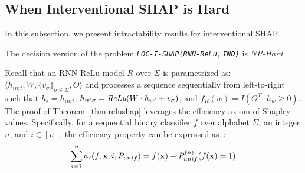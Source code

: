 \subsection{When Interventional SHAP is Hard}
\label{subsec:rnnreluhard}
In this subsection, we present intractability results for interventional SHAP.

\begin{theorem} \label{thm:relushap}
    The decision version of the problem \emph{\texttt{LOC-I-SHAP}}\emph{\texttt{(RNN-ReLu}, \texttt{IND)}} is \emph{NP-Hard}.
\end{theorem}

Recall that an RNN-ReLu model $R$ over $\Sigma$ is parametrized as: $\langle h_{init}, W, \{v_{\sigma}\}_{\sigma \in \Sigma}, O\rangle$ and processes a sequence sequentially from left-to-right such that $h_{\epsilon} = h_{init}$, $h_{w'\sigma} = \emph{ReLu}(W \cdot h_{w'} + v_{\sigma} )$, and $f_{R}(w) = I(O^{T} \cdot h_{w} \geq 0)$. The proof of Theorem~\ref{thm:relushap} leverages the efficiency axiom of Shapley values. Specifically, for a sequential binary classifier $f$ over alphabet $\Sigma$, an integer $n$, and $i \in [n]$, the efficiency property can be expressed as~\citep{arenas23}:
\begin{equation} \label{eq:efficiency}
\sum\limits_{i=1}^{n} \phi_i(f,\textbf{x},i,P_{unif}) =  f(\textbf{x}) - 
 P_{unif}^{(n)} (f(\textbf{x}) = 1) \end{equation}





